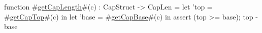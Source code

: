 function #\hyperref[zgetCapLength]{getCapLength}#(c) : CapStruct -> CapLen =
         let 'top = #\hyperref[zgetCapTop]{getCapTop}#(c) in
         let 'base = #\hyperref[zgetCapBase]{getCapBase}#(c) in {
             assert (top >= base);
             top - base
         }
